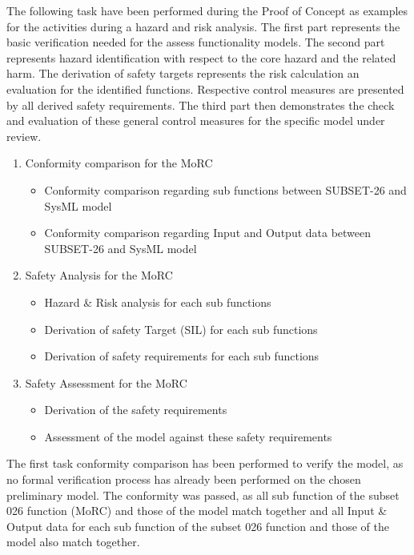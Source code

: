 \documentclass{template/openetcs_report}
\begin{document}
The following task have been performed during the Proof of Concept as examples for the activities during a hazard and risk analysis. The first part represents the basic verification needed for the assess functionality models. The second part represents hazard identification with respect to the core hazard and the related harm. The derivation of safety targets represents the risk calculation an evaluation for the identified functions. Respective control measures are presented by all derived safety requirements.
The third part then demonstrates the check and evaluation of these general control measures for the specific model under review.
 
\begin{enumerate}
\item Conformity comparison for the MoRC
	\begin{itemize}
	\item Conformity comparison regarding sub functions between SUBSET-26 and SysML model
	\item Conformity comparison regarding Input and Output data between SUBSET-26 and SysML model
	\end{itemize}
	
\item Safety Analysis for the MoRC
	\begin{itemize}
	\item Hazard \& Risk analysis for each sub functions
	\item Derivation of safety Target (SIL) for each sub functions
	\item Derivation of safety requirements for each sub functions
	\end{itemize}
	
\item Safety Assessment for the MoRC
	\begin{itemize}
	\item Derivation of the safety requirements
	\item Assessment of the model against these safety requirements
	\end{itemize}
\end{enumerate} 
 

The first task conformity comparison has been performed to verify the model, as no formal verification process has already been performed on the chosen preliminary model. The conformity was passed, as all sub function of the subset 026 function (MoRC) and those of the model match together and all Input \& Output data for each sub function of the subset 026 function and those of the model also match together. 
\end{document}
